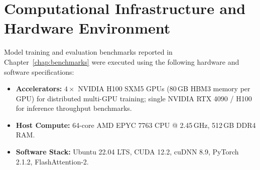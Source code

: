 \section{Computational Infrastructure and Hardware Environment}

Model training and evaluation benchmarks reported in Chapter~\ref{chap:benchmarks} were executed using the following hardware and software specifications:
\begin{itemize}
    \item \textbf{Accelerators:} $4\times$ NVIDIA H100 SXM5 GPUs (80\,GB HBM3 memory per GPU) for distributed multi-GPU training; single NVIDIA RTX 4090 / H100 for inference throughput benchmarks.
    \item \textbf{Host Compute:} 64-core AMD EPYC 7763 CPU @ 2.45\,GHz, 512\,GB DDR4 RAM.
    \item \textbf{Software Stack:} Ubuntu 22.04 LTS, CUDA 12.2, cuDNN 8.9, PyTorch 2.1.2, FlashAttention-2.
\end{itemize}
